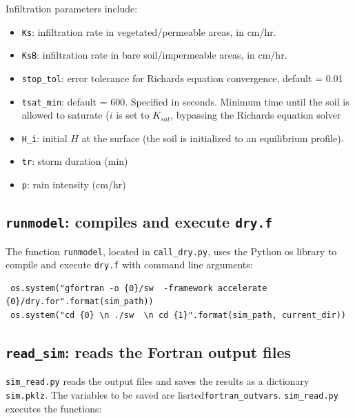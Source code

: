 \documentclass{article}
\newcommand{\code}[1]{\texttt{#1}}
\begin{document}
Infiltration parameters include:
\begin{itemize}
	\item \code{Ks}: infiltration rate in vegetated/permeable areas, in cm/hr.  
	\item \code{KsB}: infiltration rate in bare soil/impermeable areas, in cm/hr.
	
	\item \code{stop\_tol}: error tolerance for Richards equation convergence,	default = 0.01

	\item \code{tsat\_min}: default = 600.  Specified in seconds.  Minimum time until the soil is allowed to saturate ($i$ is set to $K_{sat}$, bypassing the Richards equation solver
	\item \code{H\_i}: initial $H$ at the surface (the soil is initialized to an equilibrium profile).

	\item \code{tr}: storm duration (min)
	\item \code{p}: rain intensity (cm/hr)
\end{itemize}


\subsection{\code{runmodel}: compiles and execute \code{dry.f}}
The function \code{runmodel}, located in \code{call\_dry.py}, uses the Python os library to compile and execute \code{dry.f} with command line arguments: 

\begin{verbatim}
 os.system("gfortran -o {0}/sw  -framework accelerate {0}/dry.for".format(sim_path))
 os.system("cd {0} \n ./sw  \n cd {1}".format(sim_path, current_dir))	
\end{verbatim}

    
\subsection{\code{read\_sim}: reads the Fortran output files }

 \code{sim\_read.py} reads the output files and saves the results as a dictionary  \code{sim.pklz}.  The variables to be saved are lisrted\code{fortran\_outvars}.   \code{sim\_read.py}  executes the functions: 
\end{document}
